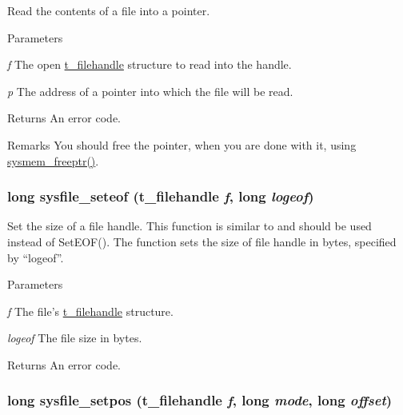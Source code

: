 Read the contents of a file into a pointer. 
\begin{DoxyParams}{Parameters}
\item[{\em f}]The open \hyperlink{group__files_gafcb776aa74d514754e83b30995b5a5d1}{t\_\-filehandle} structure to read into the handle. \item[{\em p}]The address of a pointer into which the file will be read. \end{DoxyParams}
\begin{DoxyReturn}{Returns}
An error code. 
\end{DoxyReturn}
\begin{DoxyRemark}{Remarks}
You should free the pointer, when you are done with it, using \hyperlink{group__memory_ga200c82639e547869db1f3887d17102d3}{sysmem\_\-freeptr()}. 
\end{DoxyRemark}
\hypertarget{group__files_ga6f17a82aafd0afdf89612b8d4c123f6d}{
\subsubsection[{sysfile\_\-seteof}]{\setlength{\rightskip}{0pt plus 5cm}long sysfile\_\-seteof ({\bf t\_\-filehandle} {\em f}, \/  long {\em logeof})}}
\label{group__files_ga6f17a82aafd0afdf89612b8d4c123f6d}


Set the size of a file handle. This function is similar to and should be used instead of SetEOF(). The function sets the size of file handle in bytes, specified by “logeof”.


\begin{DoxyParams}{Parameters}
\item[{\em f}]The file's \hyperlink{group__files_gafcb776aa74d514754e83b30995b5a5d1}{t\_\-filehandle} structure. \item[{\em logeof}]The file size in bytes. \end{DoxyParams}
\begin{DoxyReturn}{Returns}
An error code. 
\end{DoxyReturn}
\hypertarget{group__files_gab832835d3d607efef4baeca7a059c6c0}{
\subsubsection[{sysfile\_\-setpos}]{\setlength{\rightskip}{0pt plus 5cm}long sysfile\_\-setpos ({\bf t\_\-filehandle} {\em f}, \/  long {\em mode}, \/  long {\em offset})}}
\label{group__files_gab832835d3d607efef4baeca7a059c6c0}


